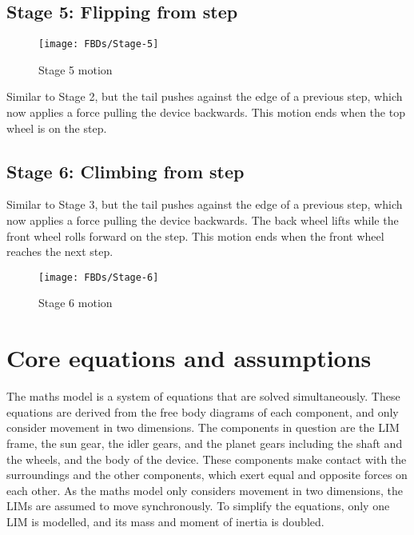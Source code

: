 \subsection*{Stage 5: Flipping from step}
\begin{wrapfigure}{r}{0.35\textwidth} %
	\centering
	\texttt{[image: FBDs/Stage-5]}
	\caption{Stage 5 motion}
	\label{fig:stage5}
\end{wrapfigure}
Similar to Stage 2, but the tail pushes against the edge of a previous step, which now applies a force pulling the device backwards. This motion ends when the top wheel is on the step.\\

\subsection*{Stage 6: Climbing from step}

Similar to Stage 3, but the tail pushes against the edge of a previous step, which now applies a force pulling the device backwards. The back wheel lifts while the front wheel rolls forward on the step. This motion ends when the front wheel reaches the next step.\\
\begin{wrapfigure}{r}{0.35\textwidth} %
	\centering
	\texttt{[image: FBDs/Stage-6]}
	\caption{Stage 6 motion}
	\label{fig:stage6}
\end{wrapfigure}

\section{Core equations and assumptions}

The maths model is a system of equations that are solved simultaneously. These equations are derived from the free body diagrams of each component, and only consider movement in two dimensions. The components in question are the LIM frame, the sun gear, the idler gears, and the planet gears including the shaft and the wheels, and the body of the device. These components make contact with the surroundings and the other components, which exert equal and opposite forces on each other. As the maths model only considers movement in two dimensions, the LIMs are assumed to move synchronously. To simplify the equations, only one LIM is modelled, and its mass and moment of inertia is doubled.\\

